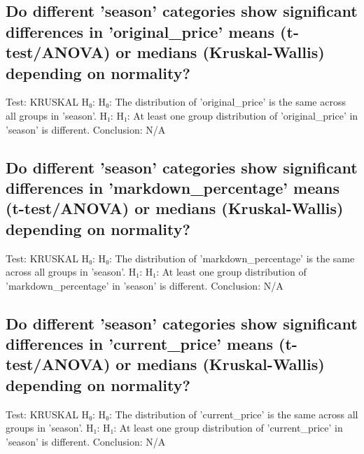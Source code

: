 \documentclass{article}%
\begin{document}
%
\subsection{Do different 'season' categories show significant differences in 'original\_price' means (t{-}test/ANOVA) or medians (Kruskal{-}Wallis) depending on normality?}%
\label{subsec:Dodifferentseasoncategoriesshowsignificantdifferencesinoriginalpricemeans(t{-}test/ANOVA)ormedians(Kruskal{-}Wallis)dependingonnormality?}%
Test: KRUSKAL\newline%
H₀: H₀: The distribution of 'original\_price' is the same across all groups in 'season'.\newline%
H₁: H₁: At least one group distribution of 'original\_price' in 'season' is different.\newline%
Conclusion: N/A

%
\subsection{Do different 'season' categories show significant differences in 'markdown\_percentage' means (t{-}test/ANOVA) or medians (Kruskal{-}Wallis) depending on normality?}%
\label{subsec:Dodifferentseasoncategoriesshowsignificantdifferencesinmarkdownpercentagemeans(t{-}test/ANOVA)ormedians(Kruskal{-}Wallis)dependingonnormality?}%
Test: KRUSKAL\newline%
H₀: H₀: The distribution of 'markdown\_percentage' is the same across all groups in 'season'.\newline%
H₁: H₁: At least one group distribution of 'markdown\_percentage' in 'season' is different.\newline%
Conclusion: N/A

%
\subsection{Do different 'season' categories show significant differences in 'current\_price' means (t{-}test/ANOVA) or medians (Kruskal{-}Wallis) depending on normality?}%
\label{subsec:Dodifferentseasoncategoriesshowsignificantdifferencesincurrentpricemeans(t{-}test/ANOVA)ormedians(Kruskal{-}Wallis)dependingonnormality?}%
Test: KRUSKAL\newline%
H₀: H₀: The distribution of 'current\_price' is the same across all groups in 'season'.\newline%
H₁: H₁: At least one group distribution of 'current\_price' in 'season' is different.\newline%
Conclusion: N/A
\end{document}
